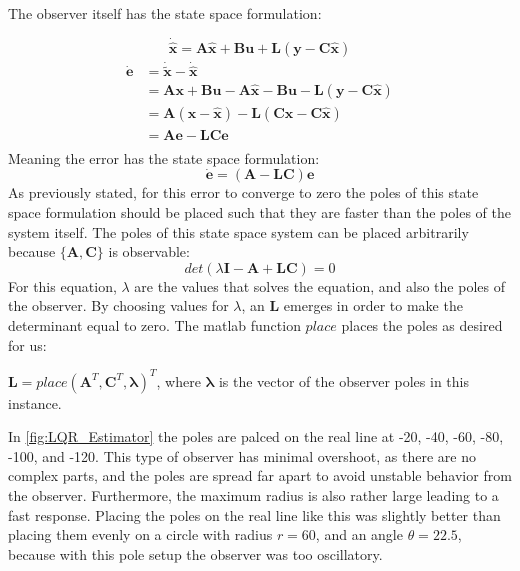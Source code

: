 The observer itself has the state space formulation:

\begin{equation*}
  \dot{\hat{\bm{x}}} = \bm{A}\hat{\bm{x}}+\bm{B}\bm{u} + \bm{L}(\bm{y}
  - \bm{C}\hat{\bm{x}})
\end{equation*}
\begin{align*}
  \dot{\bm{e}} &= \dot{\bm{\tilde{x}}} - \dot{\hat{\bm{x}}} \\
               &= \bm{Ax} + \bm{Bu} - \bm{A}\hat{\bm{x}} - \bm{Bu} - \bm{L}(\bm{y}- \bm{C}\hat{\bm{x}}) \\
               &= \bm{A}(\bm{x} - \hat{\bm{x}}) - \bm{L}(\bm{C}\bm{x}- \bm{C}\hat{\bm{x}}) \\
               &= \bm{Ae} - \bm{LCe} \\
\end{align*}
Meaning the error has the state space formulation:
\begin{equation}
  \dot{\bm{e}} = (\bm{A} - \bm{LC})\bm{e}
\end{equation}
As previously stated, for this error to converge to zero the poles of this state space formulation should be placed such that they are
faster than the poles of the system itself. The poles of this state
space system can be placed arbitrarily because $\{\bm{A},\bm{C}\}$ is
observable:
\begin{equation*}
  det(\lambda\bm{I} - \bm{A} +\bm{LC}) = 0
\end{equation*}
For this equation, $\lambda$ are the values that solves the equation,
and also the poles of the observer. By choosing values for $\lambda$,
an $\bm{L}$ emerges in order to make the determinant equal to
zero. The matlab function $place$ places the poles as desired for us:

$\bm{L} = place(\bm{A}^T,\bm{C}^T,\bm{\lambda})^T$, where
$\bm{\lambda}$ is the vector of the observer poles in this instance.

In \cref{fig:LQR_Estimator} the poles are palced on the real line at -20, -40, -60, -80, -100, and -120. This type of observer has minimal overshoot, as there are no complex parts, and the poles are spread far apart to avoid unstable behavior from the observer. Furthermore, the maximum radius is also rather large leading to a fast response. Placing the poles on the real line like this was slightly better than placing them evenly on a circle with radius $r = 60$, and an angle $\theta = 22.5$, because with this pole setup the observer was too oscillatory.

